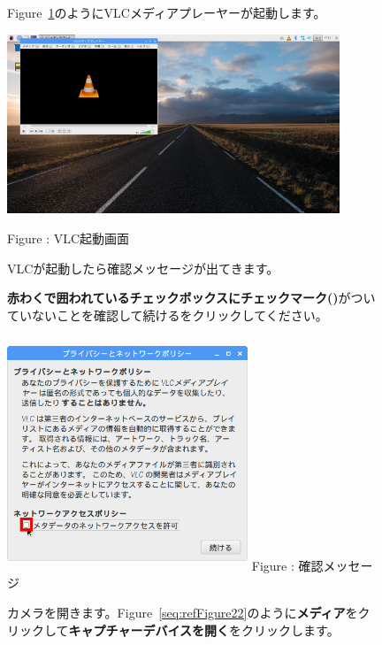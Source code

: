 \documentclass[a4paper,12pt]{jarticle}
\begin{document}
\begin{figure}[ht]
  Figure~\ref{seq:refFigure20}のようにVLCメディアプレーヤーが起動します。



  \centering
  \begin{minipage}{9.684cm}
    \includegraphics[width=9.948cm,height=5.364cm]{textbook-img114.jpg}


    Figure {\theFigure\label{seq:refFigure20}}: VLC起動画面
  \end{minipage}
  \flushleft
  VLCが起動したら確認メッセージが出てきます。

  \textbf{\textcolor[rgb]{1.0,0.2,0.2}{赤わくで囲われているチェックボックスにチェックマーク(\CheckedBox)}}がついていないことを確認して続けるをクリックしてください。



  \centering
  \begin{minipage}{7.186cm}
    {\upshape
      \includegraphics[width=7.2cm,height=7.0cm]{textbook-img115.png}
      \newline
      Figure : 確認メッセージ}
  \end{minipage}

  \flushleft
  カメラを開きます。Figure~\ref{seq:refFigure22}のように\textbf{メディア}をクリックして\textbf{キャプチャーデバイスを開く}をクリックします。



\end{figure}
\end{document}
